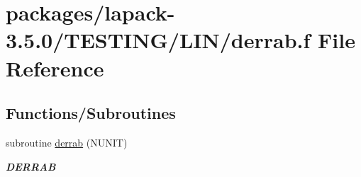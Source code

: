 \hypertarget{derrab_8f}{}\section{packages/lapack-\/3.5.0/\+T\+E\+S\+T\+I\+N\+G/\+L\+I\+N/derrab.f File Reference}
\label{derrab_8f}
\subsection*{Functions/\+Subroutines}
\begin{DoxyCompactItemize}
\item 
subroutine \hyperlink{group__double__lin_gab167d767bef7d59533113fa5e1dc2ddf}{derrab} (N\+U\+N\+I\+T)
\begin{DoxyCompactList}\small\item\em {\bfseries D\+E\+R\+R\+A\+B} \end{DoxyCompactList}\end{DoxyCompactItemize}
